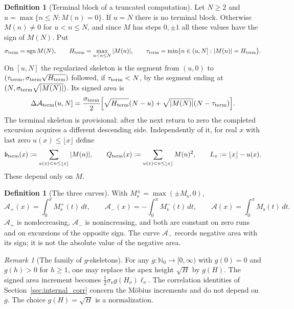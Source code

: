 \documentclass[11pt,reqno]{amsart}
\numberwithin{equation}{section}
\theoremstyle{plain}
\theoremstyle{definition}
\newtheorem{definition}[theorem]{Definition}
\theoremstyle{remark}
\newtheorem{remark}[theorem]{Remark}
\DeclareMathOperator{\sgn}{sgn}
\newcommand{\Ms}{M_{\mathrm{s}}}
\newcommand{\Ap}{\mathcal{A}_{+}}
\newcommand{\Am}{\mathcal{A}_{-}}
\newcommand{\Anet}{\mathcal{A}}
\begin{document}
\begin{definition}[Terminal block of a truncated computation]
\label{def:Ms-terminal}
Let $N\ge2$ and $u=\max\{n\le N:M(n)=0\}$. If $u=N$ there is no terminal
block. Otherwise $M(n)\ne0$ for $u<n\le N$, and since $M$ has steps
$0,\pm1$ all these values have the sign of $M(N)$. Put
\begin{equation}
\sigma_{\rm term}=\sgn M(N),\qquad
H_{\rm term}=\max_{u<n\le N}|M(n)|,\qquad
\tau_{\rm term}=\min\{n\in(u,N]:|M(n)|=H_{\rm term}\}.
\end{equation}
On $[u,N]$ the regularized skeleton is the segment from $(u,0)$ to
$(\tau_{\rm term},\sigma_{\rm term}\sqrt{H_{\rm term}})$ followed, if
$\tau_{\rm term}<N$, by the segment ending at
$(N,\sigma_{\rm term}\sqrt{|M(N)|})$. Its signed area is
\begin{equation}
\Delta\Anet_{\rm term}(u,N]=\frac{\sigma_{\rm term}}2
\Bigl[\sqrt{H_{\rm term}}(N-u)+
\sqrt{|M(N)|}(N-\tau_{\rm term})\Bigr].
\end{equation}
The terminal skeleton is provisional: after the next return to zero the
completed excursion acquires a different descending side. Independently of
it, for real $x$ with last zero $u(x)\le\lfloor x\rfloor$ define
\begin{equation}
\mathfrak b_{\rm term}(x):=\sum_{u(x)<n\le\lfloor x\rfloor}|M(n)|,\qquad
Q_{\rm term}(x):=\sum_{u(x)<n\le\lfloor x\rfloor}M(n)^2,\qquad
L_x:=\lfloor x\rfloor-u(x).
\end{equation}
These depend only on $M$.
\end{definition}

\begin{definition}[The three curves]
\label{def:areas}
With $\Ms^{\pm}=\max(\pm\Ms,0)$,
\begin{equation}
\label{eq:areas_def}
\Ap(x)=\int_0^x\Ms^+(t)\,dt,\qquad
\Am(x)=-\int_0^x\Ms^-(t)\,dt,\qquad
\Anet(x)=\int_0^x\Ms(t)\,dt.
\end{equation}
$\Ap$ is nondecreasing, $\Am$ is nonincreasing, and both are constant on
zero runs and on excursions of the opposite sign.  The curve $\Am$ records
negative area with its sign; it is not the absolute value of the negative
area.
\end{definition}

\begin{remark}[The family of $g$-skeletons]
\label{rem:g-skeleton}
For any $g:\mathbb N_0\to[0,\infty)$ with $g(0)=0$ and $g(h)>0$ for $h\ge1$,
one may replace the apex height $\sqrt H$ by $g(H)$. The signed area
increment becomes $\tfrac12\sigma_\nu g(H_\nu)\ell_\nu$. The correlation
identities of Section~\ref{sec:internal_corr} concern the M\"obius
increments and do not depend on $g$. The choice $g(H)=\sqrt H$ is a
normalization.
\end{remark}
\end{document}
